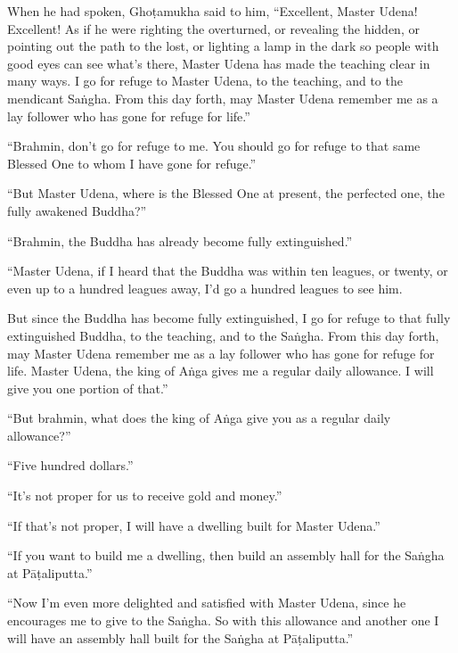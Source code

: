 \documentclass[12pt,openany]{book}%
\begin{document}
When he had spoken, \textsanskrit{Ghoṭamukha} said to him, “Excellent, Master Udena! Excellent! As if he were righting the overturned, or revealing the hidden, or pointing out the path to the lost, or lighting a lamp in the dark so people with good eyes can see what’s there, Master Udena has made the teaching clear in many ways. I go for refuge to Master Udena, to the teaching, and to the mendicant \textsanskrit{Saṅgha}. From this day forth, may Master Udena remember me as a lay follower who has gone for refuge for life.” 

“Brahmin, don’t go for refuge to me. You should go for refuge to that same Blessed One to whom I have gone for refuge.” 

“But Master Udena, where is the Blessed One at present, the perfected one, the fully awakened Buddha?” 

“Brahmin, the Buddha has already become fully extinguished.” 

“Master Udena, if I heard that the Buddha was within ten leagues, or twenty, or even up to a hundred leagues away, I’d go a hundred leagues to see him. 

But since the Buddha has become fully extinguished, I go for refuge to that fully extinguished Buddha, to the teaching, and to the \textsanskrit{Saṅgha}. From this day forth, may Master Udena remember me as a lay follower who has gone for refuge for life. Master Udena, the king of \textsanskrit{Aṅga} gives me a regular daily allowance. I will give you one portion of that.” 

“But brahmin, what does the king of \textsanskrit{Aṅga} give you as a regular daily allowance?” 

“Five hundred dollars.” 

“It’s not proper for us to receive gold and money.” 

“If that’s not proper, I will have a dwelling built for Master Udena.” 

“If you want to build me a dwelling, then build an assembly hall for the \textsanskrit{Saṅgha} at \textsanskrit{Pāṭaliputta}.” 

“Now I’m even more delighted and satisfied with Master Udena, since he encourages me to give to the \textsanskrit{Saṅgha}. So with this allowance and another one I will have an assembly hall built for the \textsanskrit{Saṅgha} at \textsanskrit{Pāṭaliputta}.” 
\end{document}
